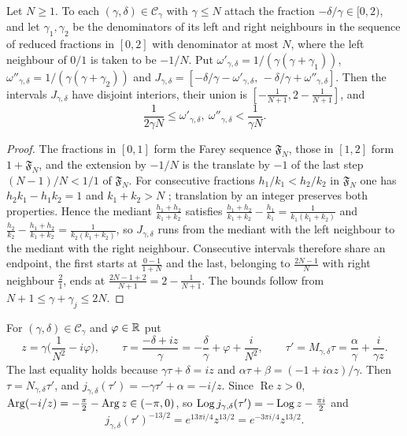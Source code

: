 \begin{lemma}\label{circ:lem:farey}
Let $N\ge1$. To each $(\gamma,\delta)\in\mathcal C_\gamma$ with $\gamma\le N$ attach the fraction $-\delta/\gamma\in[0,2)$, and let $\gamma_1,\gamma_2$ be the denominators of its left and right neighbours in the sequence of reduced fractions in $[0,2]$ with denominator at most $N$, where the left neighbour of $0/1$ is taken to be $-1/N$. Put $\omega'_{\gamma,\delta}=1/(\gamma(\gamma+\gamma_1))$, $\omega''_{\gamma,\delta}=1/(\gamma(\gamma+\gamma_2))$ and $J_{\gamma,\delta}=[-\delta/\gamma-\omega'_{\gamma,\delta},\,-\delta/\gamma+\omega''_{\gamma,\delta}]$. Then the intervals $J_{\gamma,\delta}$ have disjoint interiors, their union is $[-\frac1{N+1},2-\frac1{N+1}]$, and
\[
\frac1{2\gamma N}\le\omega'_{\gamma,\delta},\ \omega''_{\gamma,\delta}<\frac1{\gamma N}.
\]
\end{lemma}

\begin{proof}
The fractions in $[0,1]$ form the Farey sequence $\mathfrak F_N$, those in $[1,2]$ form $1+\mathfrak F_N$, and the extension by $-1/N$ is the translate by $-1$ of the last step $(N-1)/N<1/1$ of $\mathfrak F_N$. For consecutive fractions $h_1/k_1<h_2/k_2$ in $\mathfrak F_N$ one has $h_2k_1-h_1k_2=1$ and $k_1+k_2>N$ \cite[Chapter~III]{HW08}; translation by an integer preserves both properties. Hence the mediant $\frac{h_1+h_2}{k_1+k_2}$ satisfies $\frac{h_1+h_2}{k_1+k_2}-\frac{h_1}{k_1}=\frac1{k_1(k_1+k_2)}$ and $\frac{h_2}{k_2}-\frac{h_1+h_2}{k_1+k_2}=\frac1{k_2(k_1+k_2)}$, so $J_{\gamma,\delta}$ runs from the mediant with the left neighbour to the mediant with the right neighbour. Consecutive intervals therefore share an endpoint, the first starts at $\frac{0-1}{1+N}$ and the last, belonging to $\frac{2N-1}N$ with right neighbour $\frac21$, ends at $\frac{2N-1+2}{N+1}=2-\frac1{N+1}$. The bounds follow from $N+1\le\gamma+\gamma_j\le2N$.
\end{proof}

For $(\gamma,\delta)\in\mathcal C_\gamma$ and $\varphi\in\mathbb{R}$ put
\begin{equation}\label{circ:z}
z=\gamma\Big(\frac1{N^2}-i\varphi\Big),\qquad\tau=\frac{-\delta+iz}\gamma=-\frac\delta\gamma+\varphi+\frac i{N^2},\qquad \tau'=M_{\gamma,\delta}\tau=\frac\alpha\gamma+\frac i{\gamma z}.
\end{equation}
The last equality holds because $\gamma\tau+\delta=iz$ and $\alpha\tau+\beta=(-1+i\alpha z)/\gamma$. Then $\tau=N_{\gamma,\delta}\tau'$, and $j_{\gamma,\delta}(\tau')=-\gamma\tau'+\alpha=-i/z$. Since $\operatorname{Re}z>0$, $\operatorname{Arg}(-i/z)=-\frac\pi2-\operatorname{Arg} z\in(-\pi,0)$, so $\operatorname{Log} j_{\gamma,\delta}(\tau')=-\operatorname{Log} z-\frac{\pi i}2$ and
\begin{equation}\label{circ:jz}
j_{\gamma,\delta}(\tau')^{-13/2}=e^{13\pi i/4}z^{13/2}=e^{-3\pi i/4}z^{13/2}.
\end{equation}

